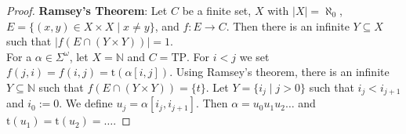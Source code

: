 \documentclass{article}
\begin{document}
\begin{proof}
	\textbf{Ramsey's Theorem}: Let $C$ be a finite set, $X$ with $|X| = \aleph_0$, $E = \{ (x, y) \in X \times X \mid x \neq y\}$, and $f : E \rightarrow C$. Then there is an infinite $Y \subseteq X$ such that $|f(E \cap (Y \times Y))| = 1$. \\
	
	For a $\alpha \in \Sigma^\omega$, let $X = \mathbb{N}$ and $C = \text{TP}$. For $i < j$ we set $f(j, i) = f(i, j) = \text{t}(\alpha[i, j])$. Using Ramsey's theorem,  there is an infinite $Y \subseteq \mathbb{N}$ such that $f(E \cap (Y \times Y)) = \{t\}$. Let $Y = \{i_j \mid j > 0 \}$ such that $i_j < i_{j+1}$ and $i_0 := 0$. We define $u_j = \alpha[i_j, i_{j+1}]$. Then $\alpha = u_0 u_1 u_2 \dots$ and $\text{t}(u_1) = \text{t}(u_2) = \dots$.
\end{proof}
\end{document}
